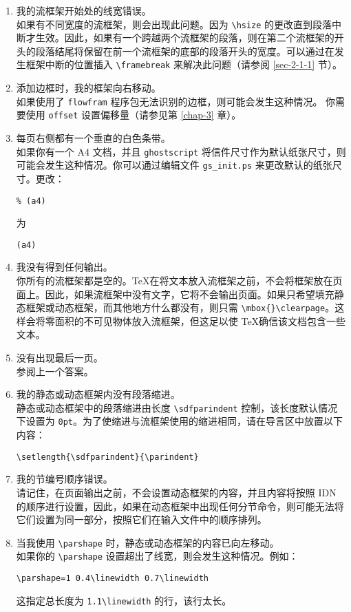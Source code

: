 \documentclass[a4paper]{book}%
\newcommand{\sty}[1]{\texttt{#1}}
\newcommand{\filename}[1]{\texttt{#1}}
\newcommand{\cmd}[1]{\texttt{#1}}
\begin{document}
\begin{enumerate}
    \item 我的流框架开始处的线宽错误。\\ 如果有不同宽度的流框架，则会出现此问题。因为 \verb|\hsize| 的更改直到段落中断才生效。因此，如果有一个跨越两个流框架的段落，则在第二个流框架的开头的段落结尾将保留在前一个流框架的底部的段落开头的宽度。可以通过在发生框架中断的位置插入 \verb|\framebreak| 来解决此问题（请参阅 \ref{sec-2-1-1} 节）。
    \item 添加边框时，我的框架向右移动。\\ 如果使用了 \sty{flowfram} 程序包无法识别的边框，则可能会发生这种情况。 你需要使用 \cmd{offset} 设置偏移量（请参见第 \ref{chap-3} 章）。
    \item 每页右侧都有一个垂直的白色条带。\\ 如果你有一个 A4 文档，并且 \filename{ghostscript} 将信件尺寸作为默认纸张尺寸，则可能会发生这种情况。你可以通过编辑文件 \filename{gs\_init.ps} 来更改默认的纸张尺寸。更改：
\begin{lstlisting}[backgroundcolor=\color{white}]
% Optionally choose a default paper size other than U.S. letter.
% (a4)
\end{lstlisting}
    为
\begin{lstlisting}[backgroundcolor=\color{white}]
% Optionally choose a default paper size other than U.S. letter.
(a4)
\end{lstlisting}
    \item 我没有得到任何输出。\\ 你所有的流框架都是空的。\TeX 在将文本放入流框架之前，不会将框架放在页面上。因此，如果流框架中没有文字，它将不会输出页面。如果只希望填充静态框架或动态框架，而其他地方什么都没有，则只需 \verb|\mbox{}\clearpage|。这样会将零面积的不可见物体放入流框架，但这足以使 \TeX 确信该文档包含一些文本。
    \item 没有出现最后一页。\\ 参阅上一个答案。
    \item 我的静态或动态框架内没有段落缩进。\\ 静态或动态框架中的段落缩进由长度 \verb|\sdfparindent| 控制，该长度默认情况下设置为 \cmd{0pt}。为了使缩进与流框架使用的缩进相同，请在导言区中放置以下内容：
    \begin{mdframed}[backgroundcolor=white]
        \verb|\setlength{\sdfparindent}{\parindent}|
    \end{mdframed}
    \item 我的节编号顺序错误。\\ 请记住，在页面输出之前，不会设置动态框架的内容，并且内容将按照 IDN 的顺序进行设置，因此，如果在动态框架中出现任何分节命令，则可能无法将它们设置为同一部分，按照它们在输入文件中的顺序排列。
    \item 当我使用 \verb|\parshape| 时，静态或动态框架的内容已向左移动。\\ 如果你的 \verb|\parshape| 设置超出了线宽，则会发生这种情况。例如：
    \begin{mdframed}[backgroundcolor=white]
        \verb|\parshape=1 0.4\linewidth 0.7\linewidth|
    \end{mdframed}
    这指定总长度为 \verb|1.1\linewidth| 的行，该行太长。
\end{enumerate}
\end{document}
